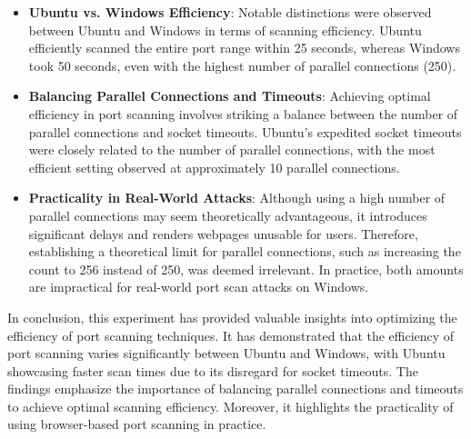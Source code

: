 \begin{itemize}
    \item \textbf{Ubuntu vs. Windows Efficiency}: Notable distinctions were observed between Ubuntu and Windows in terms of scanning efficiency. Ubuntu efficiently scanned the entire port range within 25 seconds, whereas Windows took 50 seconds, even with the highest number of parallel connections (250).

    \item \textbf{Balancing Parallel Connections and Timeouts}: Achieving optimal efficiency in port scanning involves striking a balance between the number of parallel connections and socket timeouts. Ubuntu's expedited socket timeouts were closely related to the number of parallel connections, with the most efficient setting observed at approximately 10 parallel connections.

    \item \textbf{Practicality in Real-World Attacks}: Although using a high number of parallel connections may seem theoretically advantageous, it introduces significant delays and renders webpages unusable for users. Therefore, establishing a theoretical limit for parallel connections, such as increasing the count to 256 instead of 250, was deemed irrelevant. In practice, both amounts are impractical for real-world port scan attacks on Windows.

\end{itemize}

In conclusion, this experiment has provided valuable insights into optimizing the efficiency of port scanning techniques. It has demonstrated that the efficiency of port scanning varies significantly between Ubuntu and Windows, with Ubuntu showcasing faster scan times due to its disregard for socket timeouts. The findings emphasize the importance of balancing parallel connections and timeouts to achieve optimal scanning efficiency. Moreover, it highlights the practicality of using browser-based port scanning in practice.





